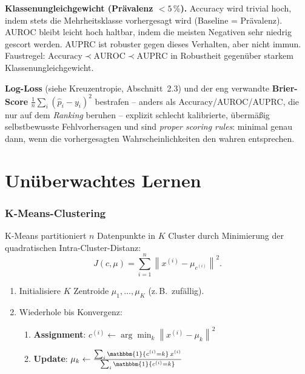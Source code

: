 \documentclass[11pt]{article}
\theoremstyle{csthm}
\theoremstyle{csdef}
\newcommand{\I}{\mathbbm{1}}
\newcommand{\norm}[1]{\left\|#1\right\|}
\begin{document}
\begin{tcolorbox}[defstyle]
\textbf{Klassenungleichgewicht (Prävalenz $<5\,\%$).} Accuracy wird trivial
hoch, indem stets die Mehrheitsklasse vorhergesagt wird (Baseline =
Prävalenz). AUROC bleibt leicht hoch haltbar, indem die meisten Negativen
sehr niedrig gescort werden. AUPRC ist robuster gegen dieses Verhalten,
aber nicht immun. Faustregel: $\text{Accuracy} \prec \text{AUROC} \prec
\text{AUPRC}$ in Robustheit gegenüber starkem Klassenungleichgewicht.
\end{tcolorbox}

\textbf{Log-Loss} (siehe Kreuzentropie, Abschnitt~2.3) und der eng verwandte
\textbf{Brier-Score} $\frac1n\sum_i(\hat p_i - y_i)^2$ bestrafen -- anders
als Accuracy/AUROC/AUPRC, die nur auf dem \emph{Ranking} beruhen -- explizit
schlecht kalibrierte, übermäßig selbstbewusste Fehlvorhersagen und sind
\emph{proper scoring rules}: minimal genau dann, wenn die vorhergesagten
Wahrscheinlichkeiten den wahren entsprechen.

\newpage
\part{Unüberwachtes Lernen}

\section{K-Means-Clustering}

K-Means partitioniert $n$ Datenpunkte in $K$ Cluster durch Minimierung der
quadratischen Intra-Cluster-Distanz:
\begin{equation}
  J(c, \mu) = \sum_{i=1}^n \norm{x^{(i)} - \mu_{c^{(i)}}}^2.
\end{equation}

\begin{tcolorbox}[algostyle, title={K-Means Algorithmus}]
\begin{enumerate}[leftmargin=*, itemsep=2pt]
  \item Initialisiere $K$ Zentroide $\mu_1,\ldots,\mu_K$ (z.\,B.\ zufällig).
  \item Wiederhole bis Konvergenz:
    \begin{enumerate}[label=(\alph*)]
      \item \textbf{Assignment}: $c^{(i)} \leftarrow \arg\min_k \norm{x^{(i)}-\mu_k}^2$
      \item \textbf{Update}: $\mu_k \leftarrow \frac{\sum_i \I\{c^{(i)}=k\}\,x^{(i)}}
              {\sum_i \I\{c^{(i)}=k\}}$
    \end{enumerate}
\end{enumerate}
\end{tcolorbox}
\end{document}
